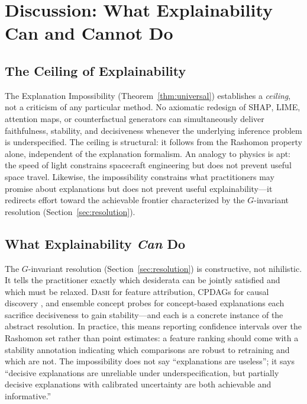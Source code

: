\documentclass{article}
\newcommand{\SHAP}{\textsc{SHAP}}
\newcommand{\DASH}{\textsc{Dash}}
\begin{document}
\section{Discussion: What Explainability Can and Cannot Do}
\label{sec:discussion}

\subsection{The Ceiling of Explainability}
\label{sec:ceiling}

The Explanation Impossibility (Theorem~\ref{thm:universal}) establishes
a \emph{ceiling}, not a criticism of any particular method.  No axiomatic
redesign of \SHAP{}, LIME, attention maps, or counterfactual generators can
simultaneously deliver faithfulness, stability, and decisiveness whenever the
underlying inference problem is underspecified.  The ceiling is structural: it
follows from the Rashomon property alone, independent of the explanation
formalism.  An analogy to physics is apt: the speed of light constrains
spacecraft engineering but does not prevent useful space travel.  Likewise, the
impossibility constrains what practitioners may promise about explanations but
does not prevent useful explainability---it redirects effort toward the
achievable frontier characterized by the $G$-invariant resolution
(Section~\ref{sec:resolution}).



\subsection{What Explainability \emph{Can} Do}
\label{sec:can-do}

The $G$-invariant resolution (Section~\ref{sec:resolution}) is constructive, not
nihilistic.  It tells the practitioner exactly which desiderata can be jointly
satisfied and which must be relaxed.  \DASH{} for feature attribution, CPDAGs
for causal discovery \citep{verma1991equivalence}, and ensemble concept probes
for concept-based explanations \citep{kim2018tcav} each sacrifice decisiveness
to gain stability---and each is a concrete instance of the abstract resolution.
In practice, this means reporting confidence intervals over the Rashomon set
\citep{fisher2019models,semenova2022existence} rather than point estimates:
a feature ranking should come with a stability annotation indicating which
comparisons are robust to retraining and which are not.  The impossibility does
not say ``explanations are useless''; it says ``decisive explanations are
unreliable under underspecification, but partially decisive explanations with
calibrated uncertainty are both achievable and informative.''
\end{document}
